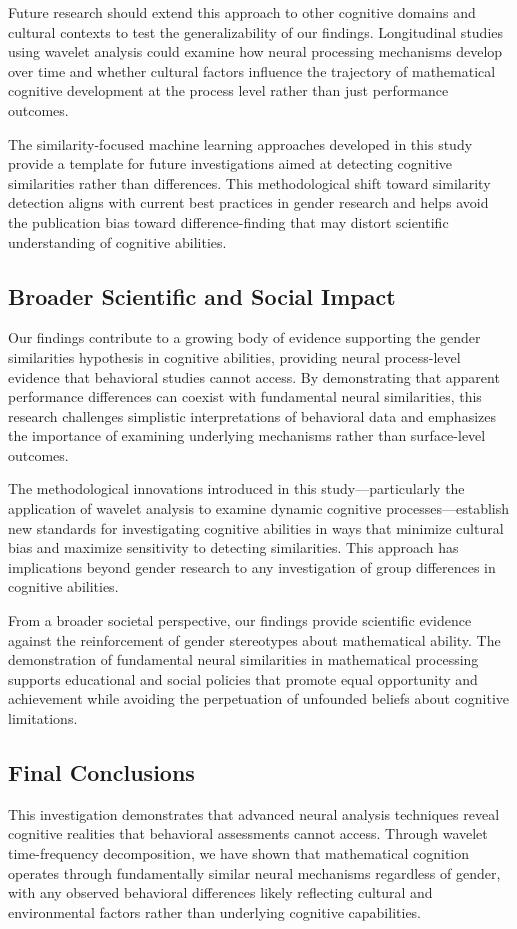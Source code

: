 \documentclass[pdflatex,reference]{sn-jnl}%
\theoremstyle{thmstyleone}%
\theoremstyle{thmstyletwo}%
\theoremstyle{thmstylethree}%
\begin{document}
Future research should extend this approach to other cognitive domains and cultural contexts to test the generalizability of our findings. Longitudinal studies using wavelet analysis could examine how neural processing mechanisms develop over time and whether cultural factors influence the trajectory of mathematical cognitive development at the process level rather than just performance outcomes.

The similarity-focused machine learning approaches developed in this study provide a template for future investigations aimed at detecting cognitive similarities rather than differences. This methodological shift toward similarity detection aligns with current best practices in gender research and helps avoid the publication bias toward difference-finding that may distort scientific understanding of cognitive abilities.


\subsection{Broader Scientific and Social Impact}
Our findings contribute to a growing body of evidence supporting the gender similarities hypothesis in cognitive abilities, providing neural process-level evidence that behavioral studies cannot access. By demonstrating that apparent performance differences can coexist with fundamental neural similarities, this research challenges simplistic interpretations of behavioral data and emphasizes the importance of examining underlying mechanisms rather than surface-level outcomes.

The methodological innovations introduced in this study—particularly the application of wavelet analysis to examine dynamic cognitive processes—establish new standards for investigating cognitive abilities in ways that minimize cultural bias and maximize sensitivity to detecting similarities. This approach has implications beyond gender research to any investigation of group differences in cognitive abilities.

From a broader societal perspective, our findings provide scientific evidence against the reinforcement of gender stereotypes about mathematical ability. The demonstration of fundamental neural similarities in mathematical processing supports educational and social policies that promote equal opportunity and achievement while avoiding the perpetuation of unfounded beliefs about cognitive limitations.


\subsection{Final Conclusions}
This investigation demonstrates that advanced neural analysis techniques reveal cognitive realities that behavioral assessments cannot access. Through wavelet time-frequency decomposition, we have shown that mathematical cognition operates through fundamentally similar neural mechanisms regardless of gender, with any observed behavioral differences likely reflecting cultural and environmental factors rather than underlying cognitive capabilities.
\end{document}
